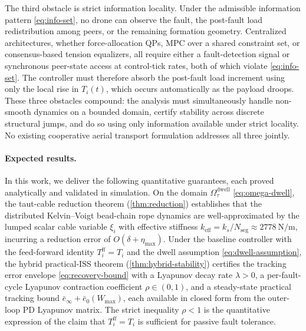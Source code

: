 The third obstacle is strict information locality. Under the admissible information pattern \eqref{eq:info-set}, no drone can observe the fault, the post-fault load redistribution among peers, or the remaining formation geometry. Centralized architectures, whether force-allocation QPs, MPC over a shared constraint set, or consensus-based tension equalizers, all require either a fault-detection signal or synchronous peer-state access at control-tick rates, both of which violate \eqref{eq:info-set}. The controller must therefore absorb the post-fault load increment using only the local rise in $T_i(t)$, which occurs automatically as the payload droops. These three obstacles compound: the analysis must simultaneously handle non-smooth dynamics on a bounded domain, certify stability across discrete structural jumps, and do so using only information available under strict locality. No existing cooperative aerial transport formulation addresses all three jointly.

\paragraph{Expected results.}
\label{sec:expected-results}
In this work, we deliver the following quantitative guarantees, each proved analytically and validated in simulation. On the domain $\Omega_\tau^{\mathrm{dwell}}$ \eqref{eq:omega-dwell}, the taut-cable reduction theorem (\cref{thm:reduction}) establishes that the distributed Kelvin--Voigt bead-chain rope dynamics are well-approximated by the lumped scalar cable variable $\xi_i$ with effective stiffness $k_{\mathrm{eff}} = k_s / N_{\mathrm{seg}} \approx \SI{2778}{\newton\per\metre}$, incurring a reduction error of $O(\delta + \eta_{\max})$. Under the baseline controller with the feed-forward identity $T_i^{\mathrm{ff}} = T_i$ and the dwell assumption \eqref{eq:dwell-assumption}, the hybrid practical-ISS theorem (\cref{thm:hybrid-stability}) certifies the tracking error envelope \eqref{eq:recovery-bound} with a Lyapunov decay rate $\lambda > 0$, a per-fault-cycle Lyapunov contraction coefficient $\rho \in (0,1)$, and a steady-state practical tracking bound $\bar{e}_{\infty} + \bar{e}_0(W_{\max})$, each available in closed form from the outer-loop PD Lyapunov matrix. The strict inequality $\rho < 1$ is the quantitative expression of the claim that $T_i^{\mathrm{ff}} = T_i$ is sufficient for passive fault tolerance.

